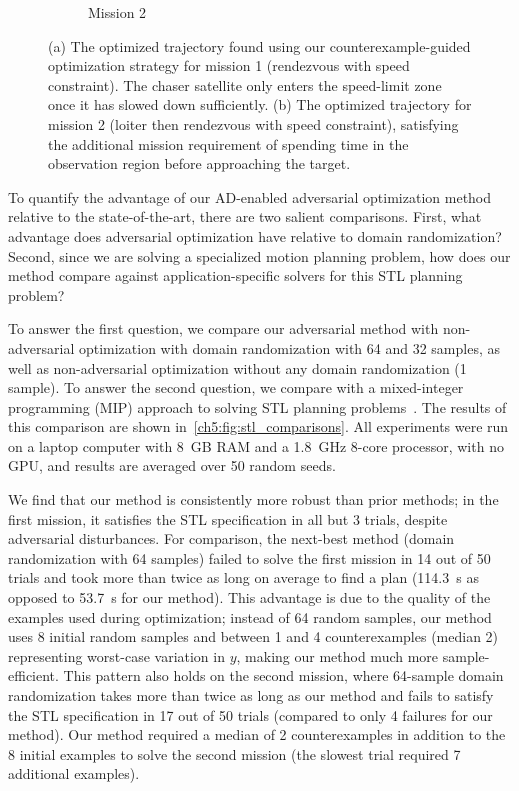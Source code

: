 \begin{figure}[t]
\begin{subfigure}[t]{0.4\linewidth}
        \caption{Mission 2}
    \end{subfigure}%
    \caption{(a) The optimized trajectory found using our counterexample-guided optimization strategy for mission 1 (rendezvous with speed constraint). The chaser satellite only enters the speed-limit zone once it has slowed down sufficiently. (b) The optimized trajectory for mission 2 (loiter then rendezvous with speed constraint), satisfying the additional mission requirement of spending time in the observation region before approaching the target.}
    \label{ch5:fig:mission_trajs}
\end{figure}

To quantify the advantage of our AD-enabled adversarial optimization method relative to the state-of-the-art, there are two salient comparisons. First, what advantage does adversarial optimization have relative to domain randomization? Second, since we are solving a specialized motion planning problem, how does our method compare against application-specific solvers for this STL planning problem?

To answer the first question, we compare our adversarial method with non-adversarial optimization with domain randomization with 64 and 32 samples, as well as non-adversarial optimization without any domain randomization (1 sample). To answer the second question, we compare with a mixed-integer programming (MIP) approach to solving STL planning problems~\cite{sunMultiagentMotionPlanning2022}. The results of this comparison are shown in~\ref{ch5:fig:stl_comparisons}. All experiments were run on a laptop computer with \SI{8}{GB} RAM and a \SI{1.8}{GHz} 8-core processor, with no GPU, and results are averaged over 50 random seeds.

We find that our method is consistently more robust than prior methods; in the first mission, it satisfies the STL specification in all but 3 trials, despite adversarial disturbances. For comparison, the next-best method (domain randomization with 64 samples) failed to solve the first mission in 14 out of 50 trials and took more than twice as long on average to find a plan (\SI{114.3}{s} as opposed to \SI{53.7}{s} for our method). This advantage is due to the quality of the examples used during optimization; instead of 64 random samples, our method uses 8 initial random samples and between 1 and 4 counterexamples (median 2) representing worst-case variation in $y$, making our method much more sample-efficient. This pattern also holds on the second mission, where 64-sample domain randomization takes more than twice as long as our method and fails to satisfy the STL specification in 17 out of 50 trials (compared to only 4 failures for our method). Our method required a median of 2 counterexamples in addition to the 8 initial examples to solve the second mission (the slowest trial required 7 additional examples).

